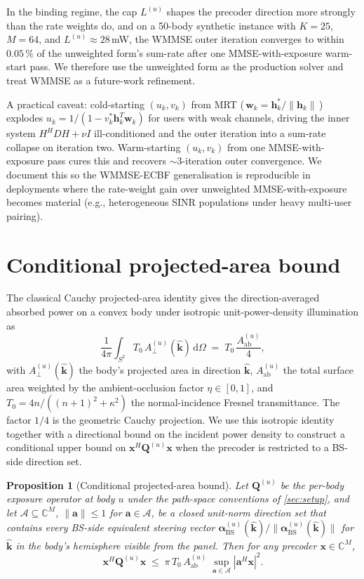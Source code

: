 \documentclass[journal,twocolumn,10pt]{IEEEtran}
\theoremstyle{plain}
\newtheorem{proposition}[theorem]{Proposition}
\theoremstyle{remark}
\newcommand{\khat}{\hat{\bm{k}}}
\newcommand{\xx}{\mathbf{x}}
\newcommand{\hh}{\mathbf{h}}
\newcommand{\ww}{\mathbf{w}}
\newcommand{\Aab}{A_{\mathrm{ab}}}
\newcommand{\Qmat}{\mathbf{Q}}
\newcommand{\diff}{\mathrm{d}}
\newcommand{\Complex}{\mathbb{C}}
\begin{document}
In the binding regime, the cap $L^{(u)}$ shapes the precoder
direction more strongly than the rate weights do, and on a 50-body
synthetic instance with $K = 25$, $M = 64$, and $L^{(u)} \approx
28\,$mW, the WMMSE outer iteration converges to within $0.05\,\%$
of the unweighted form's sum-rate after one MMSE-with-exposure
warm-start pass. We therefore use the unweighted form as the
production solver and treat WMMSE as a future-work refinement.

A practical caveat: cold-starting $(u_k, v_k)$ from MRT
(\,$\ww_k = \hh_k^* / \|\hh_k\|$\,) explodes $u_k = 1/(1 - v_k^*
\hh_k^T \ww_k)$ for users with weak channels, driving the inner
system $H^H D H + \nu I$ ill-conditioned and the outer iteration
into a sum-rate collapse on iteration two. Warm-starting $(u_k, v_k)$
from one MMSE-with-exposure pass cures this and recovers
$\sim 3$-iteration outer convergence. We document this so the
WMMSE-ECBF generalisation is reproducible in deployments where the
rate-weight gain over unweighted MMSE-with-exposure becomes
material (e.g., heterogeneous SINR populations under heavy
multi-user pairing).


\section{Conditional projected-area bound}\label{app:cauchy}

The classical Cauchy projected-area identity gives the
direction-averaged absorbed power on a convex body under isotropic
unit-power-density illumination as
\begin{equation}\label{eq:cauchy-iso}
  \frac{1}{4\pi} \int_{S^2} T_0\,A_\perp^{(u)}(\khat)\,\diff\Omega
  \;=\; T_0\,\frac{\Aab^{(u)}}{4},
\end{equation}
with $A_\perp^{(u)}(\khat)$ the body's projected area in direction
$\khat$, $\Aab^{(u)}$ the total surface area weighted by the
ambient-occlusion factor $\eta \in [0,1]$, and $T_0 = 4n/((n+1)^2
+ \kappa^2)$ the normal-incidence Fresnel transmittance. The
factor $1/4$ is the geometric Cauchy projection. We use this
isotropic identity together with a directional bound on the
incident power density to construct a conditional upper bound on
$\xx^H \Qmat^{(u)} \xx$ when the precoder is restricted to a
BS-side direction set.

\begin{proposition}[Conditional projected-area bound]\label{thm:cauchy-cond}
Let $\Qmat^{(u)}$ be the per-body exposure operator at body $u$
under the path-space conventions of \cref{sec:setup}, and let
$\mathcal{A} \subseteq \Complex^M$, $\|\mathbf{a}\| \leq 1$ for
$\mathbf{a} \in \mathcal{A}$, be a closed unit-norm direction set
that contains every BS-side equivalent steering vector
$\bm\alpha_{\mathrm{BS}}^{(u)}(\khat)/\|\bm\alpha_{\mathrm{BS}}^{(u)}(\khat)\|$
for $\khat$ in the body's hemisphere visible from the panel. Then
for any precoder $\xx \in \Complex^M$,
\begin{equation}\label{eq:cauchy-cond}
  \xx^H \Qmat^{(u)} \xx \;\leq\; \pi\,T_0\,\Aab^{(u)}\;
  \sup_{\mathbf{a} \in \mathcal{A}} |\mathbf{a}^H \xx|^2.
\end{equation}
\end{proposition}
\end{document}

